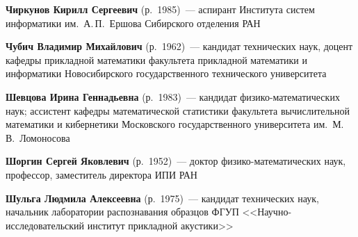 \begin{multicols}{2}
\vspace*{3pt}

\noindent
\textbf{Чиркунов Кирилл Сергеевич} (р.\ 1985)~--- 
аспирант Института систем информатики им.\ А.\,П.~Ершова Сибирского
отделения РАН

\vspace*{3pt}

\noindent
\textbf{Чубич Владимир Михайлович} (р.\ 1962)~--- 
кандидат технических наук, доцент
кафедры прикладной математики факультета прикладной математики и информатики 
Новосибирского государственного технического университета

\vspace*{3pt}

\noindent
\textbf{Шевцова Ирина Геннадьевна}  (р.\ 1983)~--- 
кандидат физико-математических наук; ассистент кафедры математической 
статистики факультета вычислительной математики и кибернетики 
Московского государственного университета им.\ М.\,В.~Ломоносова

    
\vspace*{3pt}

\noindent
\textbf{Шоргин Сергей Яковлевич} (р.\ 1952)~--- доктор 
фи\-зи\-ко-математических наук, профессор, заместитель директора ИПИ РАН 

\vspace*{3pt}

\noindent
\textbf{Шульга Людмила Алексеевна} (р.\ 1975)~--- 
кандидат технических наук, начальник лаборатории распознавания 
образцов ФГУП <<Научно-ис\-сле\-до\-ва\-тель\-ский институт прикладной акустики>>



\end{multicols}